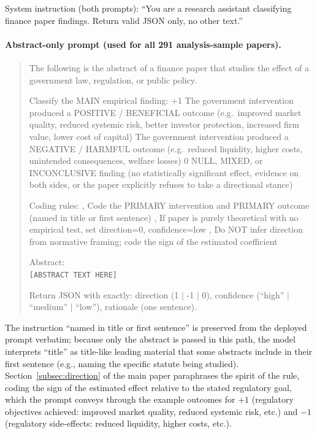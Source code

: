 \documentclass[12pt]{article}
\begin{document}
System instruction (both prompts): ``You are a research assistant
classifying finance paper findings. Return valid JSON only, no other
text.''

\paragraph{Abstract-only prompt (used for all 291 analysis-sample papers).}
\begin{quote}
\small
The following is the abstract of a finance paper that studies the effect
of a government law, regulation, or public policy.

Classify the MAIN empirical finding:
\newline\quad +1 \enspace The government intervention produced a POSITIVE / BENEFICIAL
outcome (e.g.\ improved market quality, reduced systemic risk, better investor
protection, increased firm value, lower cost of capital)
\newline{} \enspace The government intervention produced a NEGATIVE / HARMFUL
outcome (e.g.\ reduced liquidity, higher costs, unintended consequences, welfare losses)
\newline\quad\phantom{+}0 \enspace NULL, MIXED, or INCONCLUSIVE finding (no statistically
significant effect, evidence on both sides, or the paper explicitly refuses to
take a directional stance)

Coding rules:
\newline, Code the PRIMARY intervention and PRIMARY outcome (named in title or first sentence)
\newline, If paper is purely theoretical with no empirical test,
\newline\phantom{,}\quad set direction=0, confidence=low
\newline, Do NOT infer direction from normative framing; code the sign of the estimated coefficient

Abstract:\\
\texttt{[ABSTRACT TEXT HERE]}

Return JSON with exactly: direction (1 $|$ -1 $|$ 0),
confidence (``high'' $|$ ``medium'' $|$ ``low''), rationale (one sentence).
\end{quote}

The instruction ``named in title or first sentence'' is preserved from
the deployed prompt verbatim; because only the abstract is passed in
this path, the model interprets ``title'' as title-like leading material
that some abstracts include in their first sentence (e.g., naming the
specific statute being studied).  Section~\ref{subsec:direction} of the
main paper paraphrases the spirit of the rule, coding the sign of the estimated
effect relative to the stated regulatory goal, which the prompt conveys
through the example outcomes for $+1$ (regulatory objectives achieved:
improved market quality, reduced systemic risk, etc.) and $-1$
(regulatory side-effects: reduced liquidity, higher costs, etc.).
\end{document}
